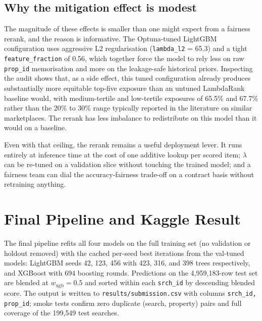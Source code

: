 \documentclass[runningheads]{llncs}
\begin{document}
\subsection{Why the mitigation effect is modest}

The magnitude of these effects is smaller than one might expect from a fairness rerank, and the reason is informative. The Optuna-tuned LightGBM configuration uses aggressive L2 regularisation (\texttt{lambda\_l2} = 65.3) and a tight \texttt{feature\_fraction} of 0.56, which together force the model to rely less on raw \texttt{prop\_id} memorisation and more on the leakage-safe historical priors. Inspecting the audit shows that, as a side effect, this tuned configuration already produces substantially more equitable top-five exposure than an untuned LambdaRank baseline would, with medium-tertile and low-tertile exposures of 65.5\% and 67.7\% rather than the 20\% to 30\% range typically reported in the literature on similar marketplaces. The rerank has less imbalance to redistribute on this model than it would on a baseline.

Even with that ceiling, the rerank remains a useful deployment lever. It runs entirely at inference time at the cost of one additive lookup per scored item; $\lambda$ can be re-tuned on a validation slice without touching the trained model; and a fairness team can dial the accuracy-fairness trade-off on a contract basis without retraining anything.

\section{Final Pipeline and Kaggle Result}\label{sec:final}

The final pipeline refits all four models on the full training set (no validation or holdout removed) with the cached per-seed best iterations from the val-tuned models: LightGBM seeds 42, 123, 456 with 423, 316, and 398 trees respectively, and XGBoost with 694 boosting rounds. Predictions on the 4{,}959{,}183-row test set are blended at $w_{\text{xgb}} = 0.5$ and sorted within each \texttt{srch\_id} by descending blended score. The output is written to \texttt{results/submission.csv} with columns \texttt{srch\_id, prop\_id}; smoke tests confirm zero duplicate (search, property) pairs and full coverage of the 199{,}549 test searches.
\end{document}
